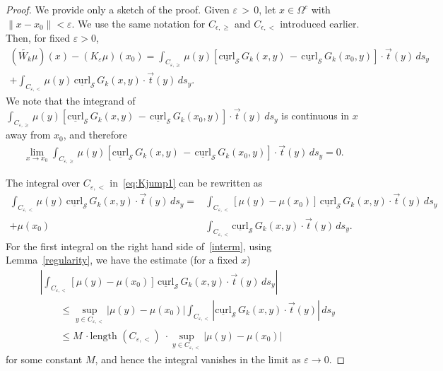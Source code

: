 \documentclass[final]{siamltex}
\renewcommand{\S} {\mathcal{S}}
\newcommand{\e}{\varepsilon}
\begin{document}
\begin{proof}
We provide only a sketch of the proof.  Given $\varepsilon \, > \,0$,
let $x\in \Omega^{c}$ with $ \| x-x_0\|<\varepsilon$.   We use the same
notation for $C_{\epsilon,\geq}$ and $C_{\epsilon,<}$ introduced
earlier.  Then, for fixed $\e>0$, 
\begin{align}
  (\widetilde{W_k}\mu)(x)-(K_{\varepsilon} \mu)(x_0) = 
  \int_{C_{\e,\geq}}\mu(y)\left[\underline{\mbox{curl}}_{\S}\, 
  G_{k}(x,y)\,-\,\underline{\mbox{curl}}_{\S}\,G_k(x_{0},y)
  \right]\cdot\vec{t}(y)\, ds_{y} \nonumber\\
  +\int_{C_{\e,<}} \mu(y)\,\underline{\mbox{curl}}_{\S}\,
  G_k(x,y)\cdot\vec{t}(y)\,ds_{y}.
  \label{eq:Kjump1}
\end{align}
We note that the integrand of $\int_{C_{\e,\geq}} \mu(y)
\left[\underline{\mbox{curl}}_{\S}\,
G_k(x,y)\,-\,\underline{\mbox{curl}}_{\S}\,G_k(x_0,y)\right]\cdot\vec{t}(y)\,
ds_{y}$ is continuous in $x$ away from  $x_0$, and therefore 
\begin{align*}
  \lim_{x\rightarrow x_0}  \int_{C_{\e,\geq}}
  \mu(y)\left[\underline{\mbox{curl}}_{\S}\,
  G_{k}(x,y)\,-\,\underline{\mbox{curl}}_{\S}\,
  G_{k}(x_{0},y)\right]\cdot\vec{t}(y)\,ds_{y} = 0.
\end{align*}

The integral over $C_{\e,<}$ in~\eqref{eq:Kjump1} can be rewritten as
\begin{align}
  \int_{C_{\e,<}} \mu(y)\,\underline{\mbox{curl}}_{\S}\,
    G_k(x,y)\cdot\vec{t}(y)\,ds_{y} 
  = &\int_{C_{\e,<}} \left[\mu(y)-\mu(x_0)\right]\,
    \underline{\mbox{curl}}_{\S}\,G_k(x,y)\cdot\vec{t}(y)\,ds_{y}
    \nonumber \\
  + \mu(x_0)&\int_{C_{\e,<}} \underline{\mbox{curl}}_{\S}\,
    G_k(x,y)\cdot\vec{t}(y)\,ds_{y}.
  \label{interm}
\end{align}
For the first integral on the right hand side of~\eqref{interm}, using
Lemma~\ref{regularity}, we have the estimate (for a fixed $x$)
\begin{align*}
  &\left|\int_{C_{\e,<}} \left[\mu(y)-\mu(x_0)\right]\,
    \underline{\mbox{curl}}_{\S}\,G_k(x,y)\cdot\vec{t}(y)\,ds_{y}\right| \\
  &\qquad \leq \sup_{y \in C_{\e,<}} |\mu(y)-\mu(x_0)|
    \int_{C_{\e,<}} \left|\underline{\mbox{curl}}_{\S}\,
    G_k(x,y)\cdot\vec{t}(y)\right|\,ds_{y}\\
  &\qquad \leq M\,\cdot \mbox{length $(C_{\e,<})$}\;
    \cdot \sup_{y \in C_{\e,<}} |\mu(y)-\mu(x_0)|
\end{align*}
for some constant $M$, and hence the integral vanishes in the limit as
$\varepsilon\longrightarrow 0$.


\end{proof}
\end{document}
